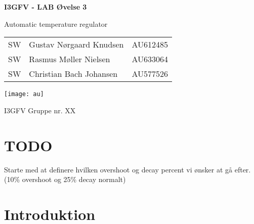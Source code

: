 \documentclass{article}
\begin{document}
\begin{titlepage}
    
  \begin{center}
    \vspace*{1cm}

    \Huge
    \textbf{I3GFV - LAB Øvelse 3}

    \vspace{0.5cm}
    \huge
    Automatic temperature regulator \\
    \date\today

    \vfill

    \Large
    \begin{tabular}{l|l|r}
      SW  & Gustav Nørgaard Knudsen  	& AU612485 \\
      SW  & Rasmus Møller Nielsen    	& AU633064 \\
      SW  & Christian Bach Johansen  	& AU577526 \\
    \end{tabular}
    
    \vfill
    \texttt{[image: au]}
    \vspace{1cm}

    I3GFV Gruppe nr. XX

  \end{center}
\end{titlepage}

\newpage

\tableofcontents
\newpage

\setcounter{page}{1}

\section{TODO}
\begin{enum}
\item Starte med at definere hvilken overshoot og decay percent vi ønsker at gå efter. (10\% overshoot og 25\% decay normalt)
\item 
\end{enum}
\section{Introduktion}


\end{document}
